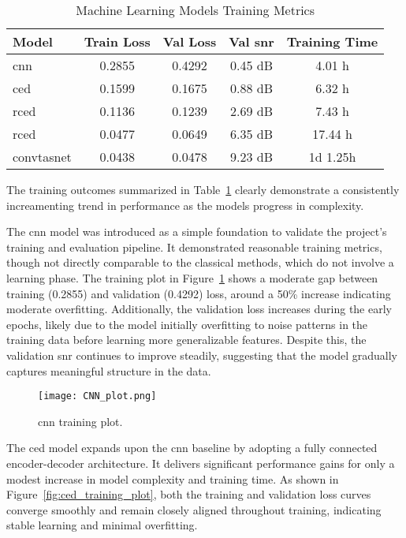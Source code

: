 \vspace{1em}
\begin{table}[H]
\centering
\caption{Machine Learning Models Training Metrics}
\label{tab:ml_training}
\begin{tabular}{|l|c|c|c|c|}
\hline
\textbf{Model} & \textbf{Train Loss} & \textbf{Val Loss} & \textbf{Val \gls{snr}} & \textbf{Training Time} \\
\hline
\gls{cnn}         & 0.2855 & 0.4292 & 0.45 dB & 4.01 h \\
\gls{ced}         & 0.1599 & 0.1675 & 0.88 dB & 6.32 h \\
\gls{rced}        & 0.1136 & 0.1239 & 2.69 dB & 7.43 h \\
\gls{rced}        & 0.0477 & 0.0649 & 6.35 dB & 17.44 h \\
\gls{convtasnet}  & 0.0438 & 0.0478 & 9.23 dB & 1d 1.25h \\
\hline
\end{tabular}
\end{table}

The training outcomes summarized in Table~\ref{tab:ml_training} clearly demonstrate a consistently increamenting trend in performance as the models progress in complexity. 

The \gls{cnn} model was introduced as a simple foundation to validate the project’s training and evaluation pipeline. It demonstrated reasonable training metrics, though not directly comparable to the classical methods, which do not involve a learning phase. The training plot in Figure~\ref{fig:cnn_training_plot} shows a moderate gap between training (0.2855) and validation (0.4292) loss, around a 50\% increase indicating moderate overfitting. Additionally, the validation loss increases during the early epochs, likely due to the model initially overfitting to noise patterns in the training data before learning more generalizable features. Despite this, the validation \gls{snr} continues to improve steadily, suggesting that the model gradually captures meaningful structure in the data.

\begin{figure}[H]
    \centering
    \texttt{[image: CNN\_plot.png]}
    \caption{\label{fig:cnn_training_plot} \gls{cnn} training plot.}
\end{figure}

The \gls{ced} model expands upon the \gls{cnn} baseline by adopting a fully connected encoder-decoder architecture. It delivers significant performance gains for only a modest increase in model complexity and training time. As shown in Figure~\ref{fig:ced_training_plot}, both the training and validation loss curves converge smoothly and remain closely aligned throughout training, indicating stable learning and minimal overfitting.

